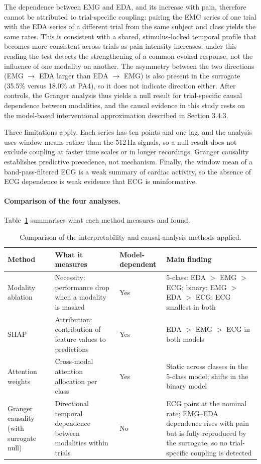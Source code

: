 The dependence between EMG and EDA, and its increase with pain, therefore cannot be attributed to trial-specific coupling: pairing the EMG series of one trial with the EDA series of a different trial from the same subject and class yields the same rates. This is consistent with a shared, stimulus-locked temporal profile that becomes more consistent across trials as pain intensity increases; under this reading the test detects the strengthening of a common evoked response, not the influence of one modality on another. The asymmetry between the two directions (EMG $\rightarrow$ EDA larger than EDA $\rightarrow$ EMG) is also present in the surrogate (35.5\% versus 18.0\% at PA4), so it does not indicate direction either. After controls, the Granger analysis thus yields a null result for trial-specific causal dependence between modalities, and the causal evidence in this study rests on the model-based interventional approximation described in Section 3.4.3.

Three limitations apply. Each series has ten points and one lag, and the analysis uses window means rather than the 512\,Hz signals, so a null result does not exclude coupling at faster time scales or in longer recordings. Granger causality establishes predictive precedence, not mechanism. Finally, the window mean of a band-pass-filtered ECG is a weak summary of cardiac activity, so the absence of ECG dependence is weak evidence that ECG is uninformative.

\paragraph{Comparison of the four analyses.} Table~\ref{tab:method-comparison} summarises what each method measures and found.

\begin{table}[h]
\centering
\caption{Comparison of the interpretability and causal-analysis methods applied.}
\label{tab:method-comparison}
\begin{tabularx}{\textwidth}{p{} p{} p{} X}
\hline
\textbf{Method} & \textbf{What it measures} & \textbf{Model-dependent} & \textbf{Main finding} \\
\hline
Modality ablation & Necessity: performance drop when a modality is masked & Yes & 5-class: EDA $>$ EMG $>$ ECG; binary: EMG $>$ EDA $>$ ECG; ECG smallest in both \\
SHAP & Attribution: contribution of feature values to predictions & Yes & EDA $>$ EMG $>$ ECG in both models \\
Attention weights & Cross-modal attention allocation per class & Yes & Static across classes in the 5-class model; shifts in the binary model \\
Granger causality (with surrogate null) & Directional temporal dependence between modalities within trials & No & ECG pairs at the nominal rate; EMG--EDA dependence rises with pain but is fully reproduced by the surrogate, so no trial-specific coupling is detected \\
\hline
\end{tabularx}
\end{table}

